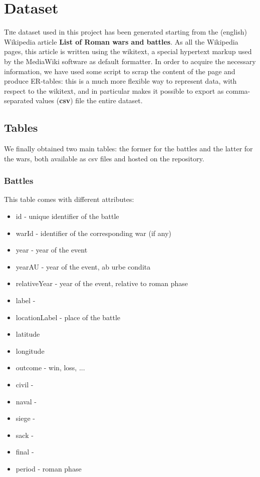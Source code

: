 \section{Dataset}

\lettrine[nindent=0em,lines=3]{T} he dataset used in this project has been generated starting from the (english) Wikipedia article \textbf{List of Roman wars and battles}. As all the Wikipedia pages, this article is written using the wikitext, a special hypertext markup used by the MediaWiki software as default formatter. In order to acquire the necessary information, we have used some script to scrap the content of the page and produce ER-tables: this is a much more flexible way to represent data, with respect to the wikitext, and in particular makes it possible to export as comma-separated values (\textbf{csv}) file the entire dataset.

\subsection{Tables}
We finally obtained two main tables: the former for the battles and the latter for the wars, both available as csv files and hosted on the repository.

\subsubsection{Battles}
This table comes with different attributes:
\begin{itemize}
    \item id - unique identifier of the battle
    \item warId - identifier of the corresponding war (if any)
    \item year - year of the event
    \item yearAU - year of the event, ab urbe condita
    \item relativeYear - year of the event, relative to roman phase
    \item label - 
    \item locationLabel - place of the battle
    \item latitude 
    \item longitude
    \item outcome - win, loss, ...
    \item civil -
    \item naval -
    \item siege -
    \item sack -
    \item final -
    \item period - roman phase
\end{itemize}

